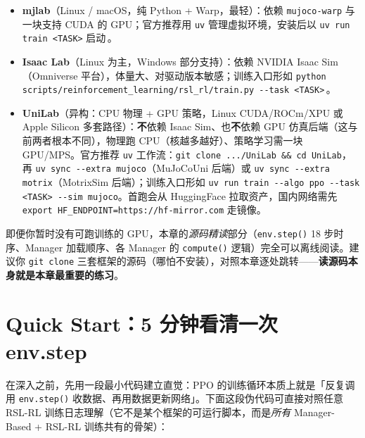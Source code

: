 \begin{itemize}
  \item \textbf{mjlab}（Linux / macOS，纯 Python + Warp，最轻）：依赖 \verb|mujoco-warp| 与一块支持 CUDA 的 GPU；官方推荐用 \verb|uv| 管理虚拟环境，安装后以 \verb|uv run train <TASK>| 启动\,\cite{mjlab2026}。
  \item \textbf{Isaac Lab}（Linux 为主，Windows 部分支持）：依赖 NVIDIA Isaac Sim（Omniverse 平台），体量大、对驱动版本敏感；训练入口形如 \verb|python scripts/reinforcement_learning/rsl_rl/train.py --task <TASK>|\,\cite{isaaclab2024}。
  \item \textbf{UniLab}（异构：CPU 物理 + GPU 策略，Linux CUDA/ROCm/XPU 或 Apple Silicon 多套路径）：\textbf{不}依赖 Isaac Sim、也\textbf{不}依赖 GPU 仿真后端（这与前两者根本不同），物理跑 CPU（核越多越好）、策略学习需一块 GPU/MPS。官方推荐 \verb|uv| 工作流：\verb|git clone .../UniLab && cd UniLab|，再 \verb|uv sync --extra mujoco|（MuJoCoUni 后端）或 \verb|uv sync --extra motrix|（MotrixSim 后端）；训练入口形如 \verb|uv run train --algo ppo --task <TASK> --sim mujoco|。首跑会从 HuggingFace 拉取资产，国内网络需先 \texttt{export HF\_ENDPOINT=https://hf-mirror.com} 走镜像。
\end{itemize}

\begin{note}
即便你暂时没有可跑训练的 GPU，本章的\emph{源码精读}部分（\verb|env.step()| 18 步时序、Manager 加载顺序、各 Manager 的 \verb|compute()| 逻辑）完全可以离线阅读。建议你 \verb|git clone| 三套框架的源码（哪怕不安装），对照本章逐处跳转——\textbf{读源码本身就是本章最重要的练习}。
\end{note}

\section*{Quick Start：5 分钟看清一次 env.step}
\label{sec:rlmc-mgr-quickstart}

在深入之前，先用一段最小代码建立直觉：PPO 的训练循环本质上就是「反复调用 \verb|env.step()| 收数据、再用数据更新网络」。下面这段伪代码可直接对照任意 RSL-RL 训练日志理解（它不是某个框架的可运行脚本，而是\emph{所有} Manager-Based + RSL-RL 训练共有的骨架）：

